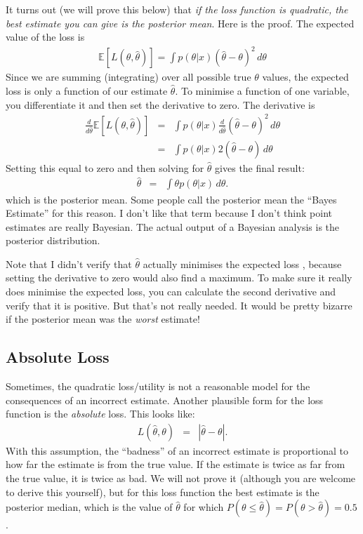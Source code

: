 It turns out (we will prove this below) that {\it if the loss function is
quadratic, the best estimate you can give is the posterior mean}.
Here is the proof. The expected value of the loss is
\begin{eqnarray}
\mathds{E}\left[L(\theta, \hat{\theta})\right] =
\int p(\theta|x)(\hat{\theta} - \theta)^2 \, d\theta
\end{eqnarray}
Since we are summing (integrating) over all possible true $\theta$ values, 
the expected loss is only a function of our estimate $\hat{\theta}$. To minimise a function
of one variable, you differentiate it and then set the derivative to zero.
The derivative is
\begin{eqnarray}
\frac{d}{d\hat{\theta}}\mathds{E}\left[L(\theta, \hat{\theta})\right] &=&
\int p(\theta|x)\frac{d}{d\hat{\theta}}(\hat{\theta} - \theta)^2 \, d\theta \\
&=& \int p(\theta|x)2(\hat{\theta} - \theta) \, d\theta
\end{eqnarray}
Setting this equal to zero and then solving for $\hat{\theta}$ gives the final
result:
\begin{eqnarray}
\hat{\theta} &=& \int \theta p(\theta|x) \, d\theta.
\end{eqnarray}
which is the posterior mean. Some people call the posterior mean the ``Bayes
Estimate'' for this reason. I don't like that term because I don't think
point estimates are really Bayesian.
The actual output of a Bayesian analysis is the posterior distribution.

Note that I didn't verify that $\hat{\theta}$ actually minimises the expected loss
, because setting the derivative to zero would also find a maximum. To make sure
it really does minimise the expected loss, you can calculate the second
derivative and verify that it is
positive. But that's not really needed. It would be pretty bizarre if the
posterior mean was the {\it worst} estimate!

\subsection{Absolute Loss}
Sometimes, the quadratic loss/utility is not a reasonable model
for the consequences of an incorrect estimate. Another plausible form for the loss
function is the {\it absolute} loss. This looks like:
\begin{eqnarray}
L(\hat{\theta}, \theta) &=& |\hat{\theta} - \theta|.
\end{eqnarray}
With this assumption, the ``badness'' of an incorrect estimate is proportional
to how far the estimate is from the true value. If the estimate is twice as
far from the true value, it is twice as bad. We will not prove it (although you
are welcome to derive this yourself), but for this loss function
the best estimate is the posterior median, which is the value of $\hat{\theta}$
for which $P(\theta \leq \hat{\theta}) = P(\theta > \hat{\theta}) = 0.5$.

